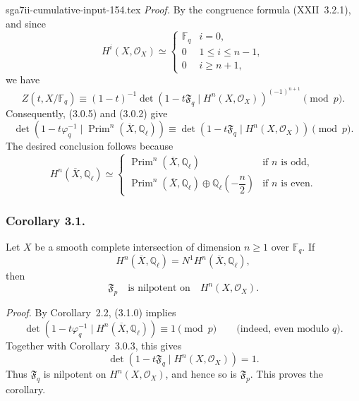 \begin{filecontents*}{sga7ii-cumulative-input-154.tex}
\medskip
\noindent\emph{Proof.}
By the congruence formula (XXII~3.2.1), and since
\begin{equation}\tag{3.0.4}
H^i(X,\mathcal O_X)\simeq
\begin{cases}
\mathbb F_q & i=0,\\[1.5ex]
0 & 1\leq i\leq n-1,\\[1.5ex]
0 & i\geq n+1,
\end{cases}
\end{equation}
we have
\begin{equation}\tag{3.0.5}
Z(t,X/\mathbb F_q)\equiv
(1-t)^{-1}
\det\!\left(1-t\mathfrak F_q\mid H^n(X,\mathcal O_X)\right)^{(-1)^{n+1}}
\pmod p.
\end{equation}
Consequently, (3.0.5) and (3.0.2) give
\begin{equation}\tag{3.0.6}
\det\!\left(1-t\varphi_q^{-1}\mid
\operatorname{Prim}^n(\overline X,\mathbb Q_\ell)\right)
\equiv
\det\!\left(1-t\mathfrak F_q\mid H^n(X,\mathcal O_X)\right)
\pmod p.
\end{equation}
The desired conclusion follows because
\begin{equation}\tag{3.0.7}
H^n(\overline X,\mathbb Q_\ell)\simeq
\begin{cases}
\operatorname{Prim}^n(\overline X,\mathbb Q_\ell)
  & \text{if $n$ is odd},\\[2mm]
\operatorname{Prim}^n(\overline X,\mathbb Q_\ell)
 \oplus\mathbb Q_\ell\!\left(-\dfrac n2\right)
  & \text{if $n$ is even}.
\end{cases}
\end{equation}

\subsubsection*{Corollary 3.1.}
Let $X$ be a smooth complete intersection of dimension $n\geq1$ over
$\mathbb F_q$.  If
\begin{equation}\tag{3.1.0}
H^n(\overline X,\mathbb Q_\ell)=N^1H^n(\overline X,\mathbb Q_\ell),
\end{equation}
then
\begin{equation}\tag{3.1.1}
\mathfrak F_p\quad\text{is nilpotent on}\quad H^n(X,\mathcal O_X).
\end{equation}

\medskip
\noindent\emph{Proof.}
By Corollary~2.2, (3.1.0) implies
\begin{equation}\tag{3.1.2}
\det\!\left(1-t\varphi_q^{-1}\mid
H^n(\overline X,\mathbb Q_\ell)\right)
\equiv1\pmod p
\qquad\text{(indeed, even modulo $q$)}.
\end{equation}
Together with Corollary~3.0.3, this gives
\begin{equation}\tag{3.1.3}
\det\!\left(1-t\mathfrak F_q\mid H^n(X,\mathcal O_X)\right)=1.
\end{equation}
Thus $\mathfrak F_q$ is nilpotent on $H^n(X,\mathcal O_X)$, and hence so is
$\mathfrak F_p$.  This proves the corollary.


\end{filecontents*}
